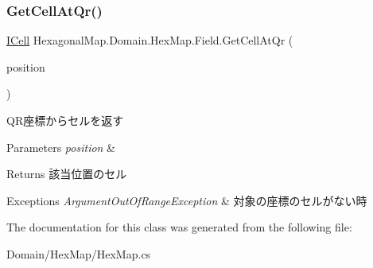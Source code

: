 \subsubsection{\texorpdfstring{Get\+Cell\+At\+Qr()}{GetCellAtQr()}}
{\footnotesize\ttfamily \mbox{\hyperlink{interface_hexagonal_map_1_1_domain_1_1_hex_map_1_1_i_cell}{I\+Cell}} Hexagonal\+Map.\+Domain.\+Hex\+Map.\+Field.\+Get\+Cell\+At\+Qr (\begin{DoxyParamCaption}\item[{\mbox{\hyperlink{struct_hexagonal_map_1_1_domain_1_1_hex_map_1_1_q_r_coordinate}{Q\+R\+Coordinate}}}]{position }\end{DoxyParamCaption})\hspace{0.3cm}{\ttfamily [inline]}}



Q\+R座標からセルを返す 


\begin{DoxyParams}{Parameters}
{\em position} & \\
\hline
\end{DoxyParams}
\begin{DoxyReturn}{Returns}
該当位置のセル
\end{DoxyReturn}

\begin{DoxyExceptions}{Exceptions}
{\em Argument\+Out\+Of\+Range\+Exception} & 対象の座標のセルがない時\\
\hline
\end{DoxyExceptions}


The documentation for this class was generated from the following file\+:\begin{DoxyCompactItemize}
\item 
Domain/\+Hex\+Map/Hex\+Map.\+cs\end{DoxyCompactItemize}
